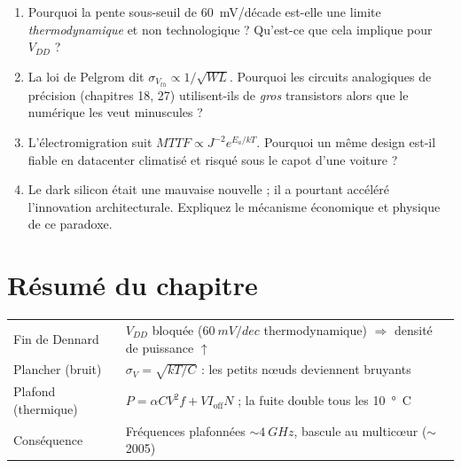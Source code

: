\documentclass[12pt,a4paper,twoside]{book}
\begin{document}
\begin{enumerate}[nosep]
\item Pourquoi la pente sous-seuil de \SI{60}{mV/décade} est-elle une limite \textit{thermodynamique} et non technologique ? Qu'est-ce que cela implique pour $V_{DD}$ ?
\item La loi de Pelgrom dit $\sigma_{V_{th}} \propto 1/\sqrt{WL}$. Pourquoi les circuits analogiques de précision (chapitres 18, 27) utilisent-ils de \textit{gros} transistors alors que le numérique les veut minuscules ?
\item L'électromigration suit $MTTF \propto J^{-2}e^{E_a/kT}$. Pourquoi un même design est-il fiable en datacenter climatisé et risqué sous le capot d'une voiture ?
\item Le dark silicon était une mauvaise nouvelle ; il a pourtant accéléré l'innovation architecturale. Expliquez le mécanisme économique et physique de ce paradoxe.
\end{enumerate}

\section*{Résumé du chapitre}

\begin{bases}[title={\color{white} Résumé --- Les Bases}]
\begin{center}
\renewcommand{\arraystretch}{1.3}
\begin{tabular}{p{3.5cm}p{9.5cm}}
\toprule
Fin de Dennard & $V_{DD}$ bloquée ($\SI{60}{mV/dec}$ thermodynamique) $\Rightarrow$ densité de puissance $\uparrow$ \\
Plancher (bruit) & $\sigma_V = \sqrt{kT/C}$ : les petits nœuds deviennent bruyants \\
Plafond (thermique) & $P = \alpha CV^2f + VI_{\text{off}}N$ ; la fuite double tous les \SI{10}{°C} \\
Conséquence & Fréquences plafonnées $\sim\SI{4}{GHz}$, bascule au multicœur ($\sim$ 2005) \\
\bottomrule
\end{tabular}
\end{center}
\end{bases}
\end{document}
